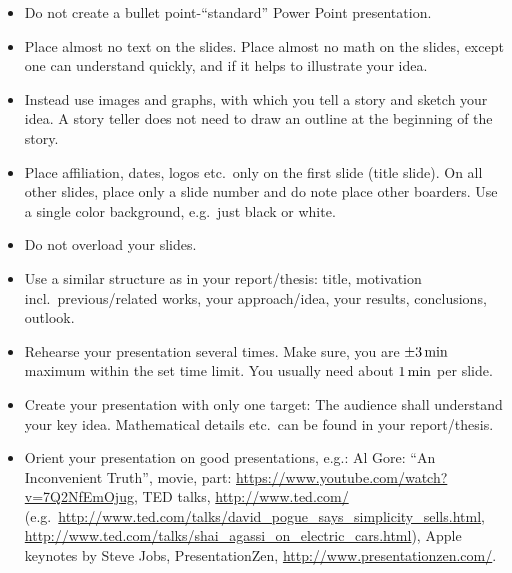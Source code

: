 \documentclass[journal]{IEEEtran}
\begin{document}
\begin{itemize}
	\item Do not create a bullet point-“standard” Power Point presentation.
	\item Place almost no text on the slides. Place almost no math on the slides, except one can understand quickly, and if it helps to illustrate your idea.
	\item Instead use images and graphs, with which you tell a story and sketch your idea. A story teller does not need to draw an outline at the beginning of the story.
	\item Place affiliation, dates, logos etc.\ only on the first slide (title slide). On all other slides, place only a slide number and do note place other boarders. Use a single color background, e.g.\ just black or white.
	\item Do not overload your slides.
	\item Use a similar structure as in your report/thesis: title, motivation incl.\ previous/related works, your approach/idea, your results, conclusions, outlook.
	\item Rehearse your presentation several times. Make sure, you are $\unit[\pm 3]{min}$ maximum within the set time limit. You usually need about $\unit[1]{min}$ per slide.
	\item Create your presentation with only one target: The audience shall understand your key idea. Mathematical details etc.\ can be found in your report/thesis.
	\item Orient your presentation on good presentations, e.g.: Al Gore: “An Inconvenient Truth”, movie, part: \url{https://www.youtube.com/watch?v=7Q2NfEmOjug}, TED talks, \url{http://www.ted.com/} (e.g.\ \url{http://www.ted.com/talks/david_pogue_says_simplicity_sells.html}, \url{http://www.ted.com/talks/shai_agassi_on_electric_cars.html}), Apple keynotes by Steve Jobs, PresentationZen, \url{http://www.presentationzen.com/}.
\end{itemize}





\end{document}
